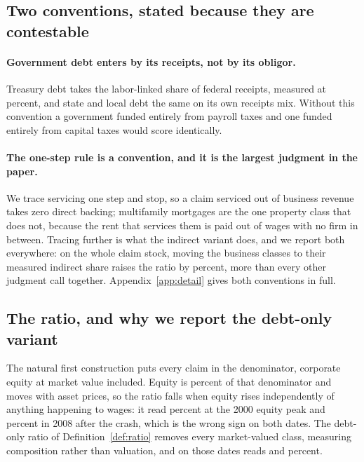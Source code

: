\subsection{Two conventions, stated because they are contestable}

\paragraph{Government debt enters by its receipts, not by its obligor.} Treasury debt takes the
labor-linked share of federal receipts, measured at  percent, and state and
local debt the same on its own receipts mix. Without this convention a government funded entirely
from payroll taxes and one funded entirely from capital taxes would score identically.

\paragraph{The one-step rule is a convention, and it is the largest judgment in the paper.} We
trace servicing one step and stop, so a claim serviced out of business revenue takes zero direct
backing; multifamily mortgages are the one property class that does not, because the rent that
services them is paid out of wages with no firm in between. Tracing further is what the indirect
variant does, and we report both everywhere: on the whole claim stock, moving the business classes
to their measured indirect share raises the ratio by  percent,
more than every other judgment call together. Appendix~\ref{app:detail} gives both conventions in
full.

\subsection{The ratio, and why we report the debt-only variant}

The natural first construction puts every claim in the denominator, corporate equity at market
value included. Equity is  percent of that denominator and moves with
asset prices, so the ratio falls when equity rises independently of anything happening to wages: it
read  percent at the 2000 equity peak and  percent in
2008 after the crash, which is the wrong sign on both dates. The debt-only ratio of
Definition~\ref{def:ratio} removes every market-valued class, measuring composition rather than
valuation, and on those dates reads  and  percent.

